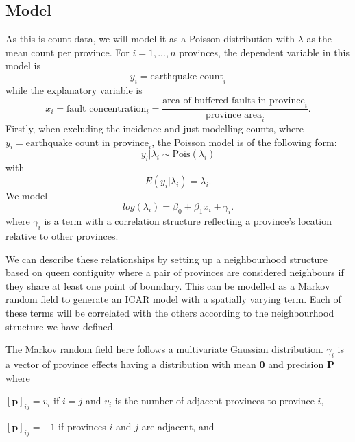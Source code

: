 \subsection{Model}\label{model}

As this is count data, we will model it as a Poisson distribution with
\(\lambda\) as the mean count per province. For \(i = 1,...,n\) provinces,
the dependent variable in this model is
\begin{equation}
y_i = \text{earthquake count}_i
\label{eq:eq1}
\end{equation}
while the explanatory variable is
\begin{equation}
x_i = \text{fault concentration}_i = \frac{\text{area of buffered faults in province}_i} {\text{province area}_i}.
\label{eq:eq2}
\end{equation}
Firstly, when excluding the incidence and just modelling counts, where
\(y_i = \text{earthquake count in province}_i\), the Poisson model is of
the following form:
\begin{equation}
y_i | \lambda_i \sim \text{Pois}(\lambda_i)
\label{eq:eq3}
\end{equation}
with
\begin{equation}
E(y_i | \lambda_i) = \lambda_i.
\label{eq:eq4}
\end{equation}
We model
\begin{equation}
log(\lambda_i) = \beta_0 + \beta_1x_i + \gamma_i.
\label{eq:eq5}
\end{equation}
where \(\gamma_i\)
is a term with a correlation structure reflecting a province's location
relative to other provinces.

We can describe these relationships by setting up a neighbourhood
structure based on queen contiguity where a pair of provinces are
considered neighbours if they share at least one point of boundary. This can be modelled as a Markov random field to generate an ICAR model with a spatially varying term. Each of these terms will be correlated with the others according to the neighbourhood structure we have defined.

The Markov random field here follows a multivariate Gaussian
distribution. \(\gamma_i\) is a vector of province effects having a
distribution with mean \textbf{0} and precision \textbf{P} where

\([\textbf{p}]_{ij} = v_i\) if \(i=j\) and \(v_i\) is the number of adjacent provinces
to province \(i\),

\([\textbf{p}]_{ij} = -1\) if provinces \(i\) and \(j\) are adjacent, and

